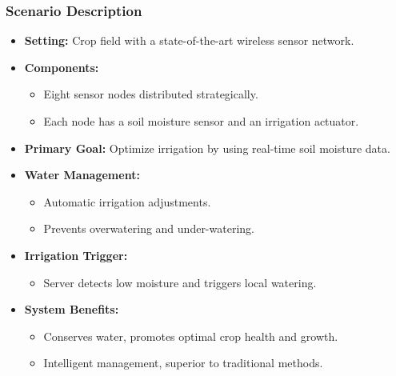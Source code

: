\begin{frame}
    \frametitle{Scenario Description}
    \begin{itemize}
        \item \textbf{Setting:} Crop field with a state-of-the-art wireless sensor network.
        \item \textbf{Components:}
        \begin{itemize}
            \item Eight sensor nodes distributed strategically.
            \item Each node has a soil moisture sensor and an irrigation actuator.
        \end{itemize}
        \item \textbf{Primary Goal:} Optimize irrigation by using real-time soil moisture data.
        \item \textbf{Water Management:}
        \begin{itemize}
            \item Automatic irrigation adjustments.
            \item Prevents overwatering and under-watering.
        \end{itemize}
        \item \textbf{Irrigation Trigger:}
        \begin{itemize}
            \item Server detects low moisture and triggers local watering.
        \end{itemize}
        \item \textbf{System Benefits:}
        \begin{itemize}
            \item Conserves water, promotes optimal crop health and growth.
            \item Intelligent management, superior to traditional methods.
        \end{itemize}
    \end{itemize}
\end{frame}

